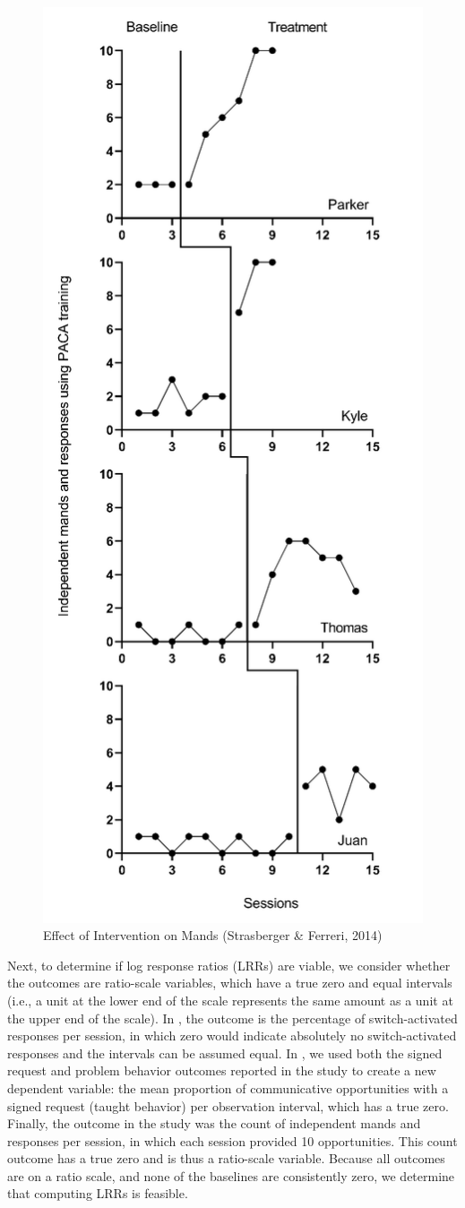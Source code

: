 \documentclass[
]{book}
\begin{document}
\begin{figure}
\includegraphics[width=0.6\linewidth]{images/StrasbergerFerreri2014} \caption{Effect of Intervention on Mands (Strasberger \& Ferreri, 2014)}\label{fig:Strasberger-2014}
\end{figure}

Next, to determine if log response ratios (LRRs) are viable, we consider whether the outcomes are ratio-scale variables, which have a true zero and equal intervals (i.e., a unit at the lower end of the scale represents the same amount as a unit at the upper end of the scale). In \citet{Byiers2014}, the outcome is the percentage of switch-activated responses per session, in which zero would indicate absolutely no switch-activated responses and the intervals can be assumed equal. In \citet{Casey1978}, we used both the signed request and problem behavior outcomes reported in the study to create a new dependent variable: the mean proportion of communicative opportunities with a signed request (taught behavior) per observation interval, which has a true zero. Finally, the outcome in the \citet{StrasbergerFerreri2014} study was the count of independent mands and responses per session, in which each session provided 10 opportunities. This count outcome has a true zero and is thus a ratio-scale variable. Because all outcomes are on a ratio scale, and none of the baselines are consistently zero, we determine that computing LRRs is feasible.
\end{document}
